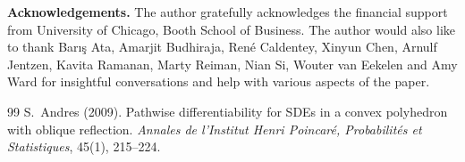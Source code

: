 \documentclass[11pt]{article}
\theoremstyle{definition}
\theoremstyle{plain}
\begin{document}
\bigskip
\noindent\textbf{Acknowledgements.} The author gratefully acknowledges the financial support from University of Chicago, Booth School of Business. 
The author would also like to thank Barış Ata, Amarjit Budhiraja, René Caldentey, Xinyun Chen, Arnulf Jentzen, Kavita Ramanan, Marty Reiman, Nian Si, Wouter van Eekelen 
and Amy Ward for insightful conversations and help with various aspects of the paper. 


\begingroup\small
\begin{singlespace}
\begin{thebibliography}{99}
S.~Andres (2009).
Pathwise differentiability for SDEs in a convex polyhedron with oblique reflection.
\emph{Annales de l'Institut Henri Poincar\'e, Probabilit\'es et Statistiques}, 45(1), 215--224.


\end{thebibliography}
\end{singlespace}
\end{document}
